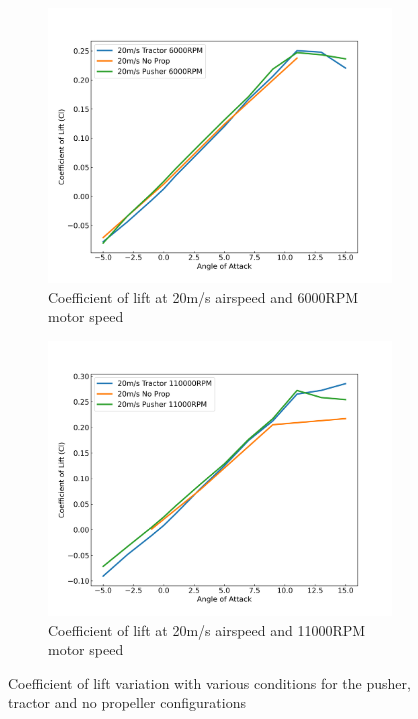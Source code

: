 \begin{figure}[H]
\begin{subfigure}[b]{0.467\textwidth}
        \label{fig:Cl_10ms_11000}
    \end{subfigure}
    \begin{subfigure}[b]{0.467\textwidth}
        \centering
        \includegraphics[width=\textwidth]{05_Results/Figs/Cl/20ms_6000RPM_Cl.png}
        \caption{Coefficient of lift at 20m/s airspeed and 6000RPM motor speed}
        \label{fig:Cl_20ms_6000}
    \end{subfigure}
    \begin{subfigure}[b]{0.467\textwidth}
        \centering
        \includegraphics[width=\textwidth]{05_Results/Figs/Cl/20ms_110000RPM_Cl.png}
        \caption{Coefficient of lift at 20m/s airspeed and 11000RPM motor speed}
        \label{fig:Cl_20ms_11000}
    \end{subfigure}
    \caption{Coefficient of lift variation with various conditions for the pusher, tractor and no propeller configurations }
\end{figure}

